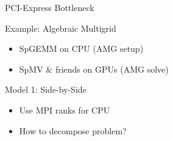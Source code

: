 \begin{frame}{PCI-Express Bottleneck}
  \begin{minipage}{0.55\textwidth}
    \begin{block}{Example: Algebraic Multigrid}
     \begin{itemize}
      \item SpGEMM on CPU (AMG setup)
      \item SpMV \& friends on GPUs (AMG solve)
     \end{itemize}
    \end{block}
    
     \begin{block}{Model 1: Side-by-Side}
     \begin{itemize}
      \item Use MPI ranks for CPU
      \item How to decompose problem?
     \end{itemize}
    \end{block}%


\end{minipage}
\end{frame}
